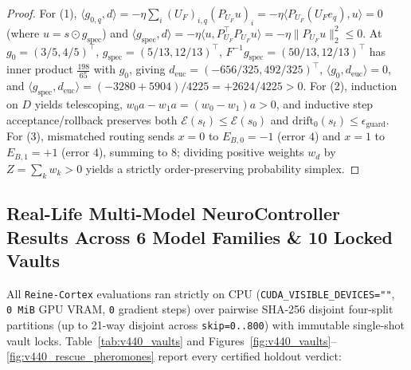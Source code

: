 \documentclass[11pt,a4paper]{article}
\begin{document}
\begin{proof}
For (1), $\langle g_{0,q}, d\rangle = -\eta \sum_i (U_F)_{i,q} (P_{U_F} u)_i = -\eta \langle P_{U_F}(U_F e_q), u\rangle = 0$ (where $u = s \odot g_{\mathrm{spec}}$) and $\langle g_{\mathrm{spec}}, d\rangle = -\eta \langle u, P_{U_F}^\top P_{U_F} u\rangle = -\eta\|P_{U_F} u\|_2^2 \le 0$. At $g_0=(3/5,4/5)^\top$, $g_{\mathrm{spec}}=(5/13,12/13)^\top$, $F^{-1}g_{\mathrm{spec}} = (50/13, 12/13)^\top$ has inner product $\frac{198}{65}$ with $g_0$, giving $d_{\mathrm{euc}} = (-656/325, 492/325)^\top$, $\langle g_0, d_{\mathrm{euc}}\rangle = 0$, and $\langle g_{\mathrm{spec}}, d_{\mathrm{euc}}\rangle = (-3280 + 5904)/4225 = +2624/4225 > 0$. For (2), induction on $D$ yields telescoping, $w_0 a - w_1 a = (w_0 - w_1)a > 0$, and inductive step acceptance/rollback preserves both $\mathcal{E}(s_t) \le \mathcal{E}(s_0)$ and $\mathrm{drift}_0(s_t) \le \epsilon_{\mathrm{guard}}$. For (3), mismatched routing sends $x=0$ to $E_{B,0}=-1$ (error $4$) and $x=1$ to $E_{B,1}=+1$ (error $4$), summing to $8$; dividing positive weights $w_d$ by $Z = \sum_k w_k > 0$ yields a strictly order-preserving probability simplex.
\end{proof}

\subsection{Real-Life Multi-Model NeuroController Results Across 6 Model Families \& 10 Locked Vaults}
\label{sec:v440_empirical_results}

All \texttt{Reine-Cortex} evaluations ran strictly on CPU (\texttt{CUDA\_VISIBLE\_DEVICES=""}, \texttt{0\,MiB} GPU VRAM, \texttt{0} gradient steps) over pairwise SHA-256 disjoint four-split partitions (up to 21-way disjoint across \texttt{skip=0..800}) with immutable single-shot vault locks. Table~\ref{tab:v440_vaults} and Figures~\ref{fig:v440_vaults}--\ref{fig:v440_rescue_pheromones} report every certified holdout verdict:
\end{document}
